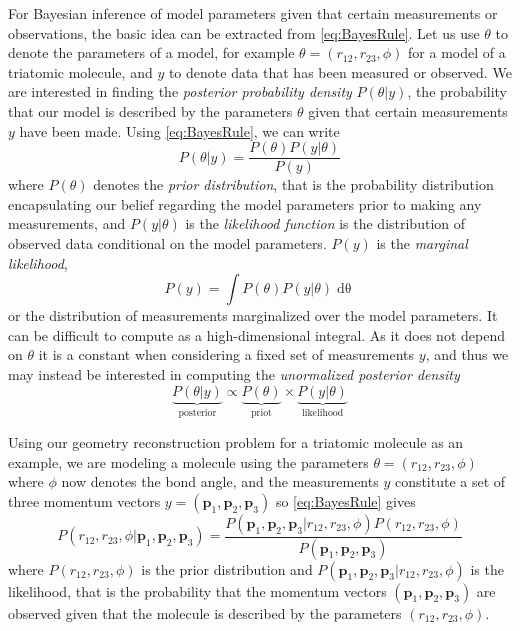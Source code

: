 
For Bayesian inference of model parameters given that certain measurements or observations, the basic idea can be extracted from \eqref{eq:BayesRule}. Let us use $\theta$ to denote the parameters of a model, for example $\theta = (r_{12}, r_{23}, \phi)$ for a model of a triatomic molecule, and $y$ to denote data that has been measured or observed. We are interested in finding the \emph{posterior probability density} $P(\theta|y)$, the probability that our model is described by the parameters $\theta$ given that certain measurements $y$ have been made. Using \eqref{eq:BayesRule}, we can write
\begin{equation}
  P(\theta|y) = \frac{P(\theta) P(y|\theta)}{P(y)}
\end{equation}
where $P(\theta)$ denotes the \emph{prior distribution}, that is the probability distribution encapsulating our belief regarding the model parameters prior to making any measurements, and $P(y|\theta)$ is the \emph{likelihood function} is the distribution of observed data conditional on the model parameters. $P(y)$ is the \emph{marginal likelihood},
\begin{equation}
  P(y) = \int P(\theta) P(y|\theta) \mathop{d\theta}
\end{equation}
or the distribution of measurements marginalized over the model parameters. It can be difficult to compute as a high-dimensional integral. As it does not depend on $\theta$ it is a constant when considering a fixed set of measurements $y$, and thus we may instead be interested in computing the \emph{unormalized posterior density}
\begin{equation}
  \underbrace{P(\theta|y)}_\mathrm{posterior}
  \propto
  \underbrace{P(\theta)}_\mathrm{priot}
  \times
  \underbrace{P(y|\theta)}_\mathrm{likelihood}
\end{equation}

Using our geometry reconstruction problem for a triatomic molecule as an example, we are modeling a molecule using the parameters $\theta = (r_{12}, r_{23}, \phi)$ where $\phi$ now denotes the bond angle, and the measurements $y$ constitute a set of three momentum vectors $y = (\mathbf{p}_1, \mathbf{p}_2, \mathbf{p}_3)$ so \eqref{eq:BayesRule} gives
\begin{equation} \label{eq:BayesGeometry}
  P(r_{12}, r_{23}, \phi|\mathbf{p}_1, \mathbf{p}_2, \mathbf{p}_3) = \frac{P(\mathbf{p}_1, \mathbf{p}_2, \mathbf{p}_3|r_{12}, r_{23}, \phi) P(r_{12}, r_{23}, \phi)}{P(\mathbf{p}_1, \mathbf{p}_2, \mathbf{p}_3)}
\end{equation}
where $P(r_{12}, r_{23}, \phi)$ is the prior distribution and $P(\mathbf{p}_1, \mathbf{p}_2, \mathbf{p}_3|r_{12}, r_{23}, \phi)$ is the likelihood, that is the probability that the momentum vectors $(\mathbf{p}_1, \mathbf{p}_2, \mathbf{p}_3)$ are observed given that the molecule is described by the parameters $(r_{12}, r_{23}, \phi)$.

